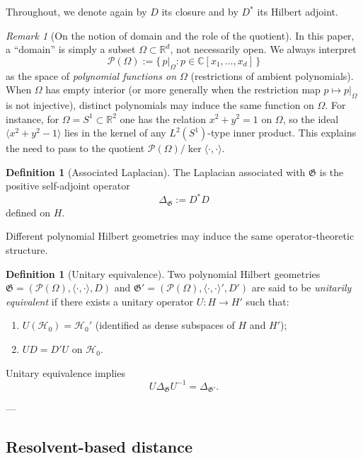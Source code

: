 \documentclass{amsart}
\numberwithin{equation}{section}
\theoremstyle{definition}
\newtheorem{definition}[theorem]{Definition}
\theoremstyle{remark}
\newtheorem{remark}[theorem]{Remark}
\begin{document}
Throughout, we denote again by $D$ its closure and by $D^*$ its Hilbert adjoint.

\begin{remark}[On the notion of domain and the role of the quotient]
In this paper, a ``domain'' is simply a subset $\Omega\subset\mathbb R^d$, not necessarily open.
We always interpret
\[
\mathcal P(\Omega):=\{\,p|_\Omega : p\in\mathbb C[x_1,\dots,x_d]\,\}
\]
as the space of \emph{polynomial functions on $\Omega$} (restrictions of ambient polynomials).
When $\Omega$ has empty interior (or more generally when the restriction map
$p\mapsto p|_\Omega$ is not injective), distinct polynomials may induce the same function on $\Omega$.
For instance, for $\Omega=S^1\subset\mathbb R^2$ one has the relation $x^2+y^2=1$ on $\Omega$,
so the ideal $\langle x^2+y^2-1\rangle$ lies in the kernel of any $L^2(S^1)$-type inner product.
This explains the need to pass to the quotient $\mathcal P(\Omega)/\ker\langle\cdot,\cdot\rangle$.
\end{remark}

\begin{definition}[Associated Laplacian]
The Laplacian associated with $\mathfrak G$ is the positive self-adjoint operator
\[
\Delta_{\mathfrak G} := D^*D
\]
defined on $H$.
\end{definition}


Different polynomial Hilbert geometries may induce the same operator-theoretic structure.

\begin{definition}[Unitary equivalence]
Two polynomial Hilbert geometries
$\mathfrak G=(\mathcal P(\Omega),\langle\cdot,\cdot \rangle,D)$ and
$\mathfrak G'=(\mathcal P(\Omega),\langle\cdot,\cdot \rangle',D')$
are said to be \emph{unitarily equivalent} if there exists a unitary operator
$U:H\to H'$ such that:
\begin{enumerate}
  \item $U(\mathcal H_0)=\mathcal H_0'$ (identified as dense subspaces of $H$ and $H'$);
  \item $UD=D'U$ on $\mathcal H_0$.
\end{enumerate}
\end{definition}

Unitary equivalence implies
\[
U\Delta_{\mathfrak G}U^{-1}=\Delta_{\mathfrak G'}.
\]

---

\subsection{Resolvent-based distance}
\end{document}
